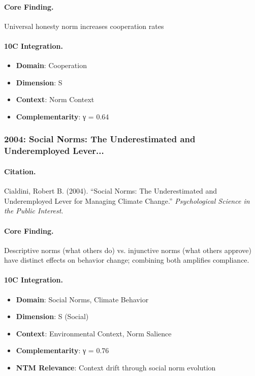 \paragraph{Core Finding.}
Universal honesty norm increases cooperation rates

\paragraph{10C Integration.}
\begin{itemize}[nosep]
  \item \textbf{Domain}: Cooperation
  \item \textbf{Dimension}: S
  \item \textbf{Context}: Norm Context
  \item \textbf{Complementarity}: γ = 0.64
\end{itemize}

\subsubsection{2004: Social Norms: The Underestimated and Underemployed Lever...}

\paragraph{Citation.}
Cialdini, Robert B. (2004). ``Social Norms: The Underestimated and Underemployed Lever for Managing Climate Change.''
\textit{Psychological Science in the Public Interest}.

\paragraph{Core Finding.}
Descriptive norms (what others do) vs. injunctive norms (what others approve) have distinct effects on behavior change; combining both amplifies compliance.

\paragraph{10C Integration.}
\begin{itemize}[nosep]
  \item \textbf{Domain}: Social Norms, Climate Behavior
  \item \textbf{Dimension}: S (Social)
  \item \textbf{Context}: Environmental Context, Norm Salience
  \item \textbf{Complementarity}: γ = 0.76
  \item \textbf{NTM Relevance}: Context drift through social norm evolution
\end{itemize}

